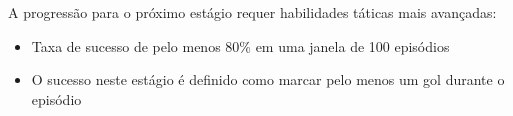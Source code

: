 A progressão para o próximo estágio requer habilidades táticas mais avançadas:
\begin{itemize}
    \item Taxa de sucesso de pelo menos 80\% em uma janela de 100 episódios
    \item O sucesso neste estágio é definido como marcar pelo menos um gol durante o episódio
\end{itemize}







